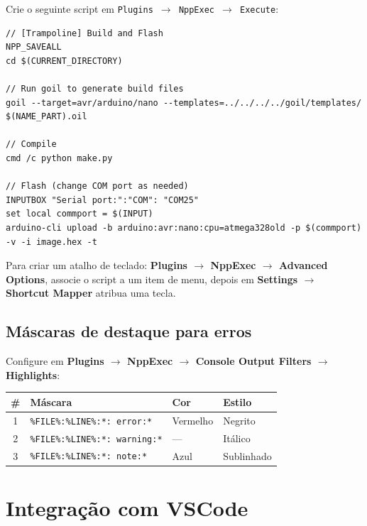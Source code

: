 \documentclass[12pt,a4paper]{article}
\begin{document}
Crie o seguinte script em \texttt{Plugins $\rightarrow$ NppExec $\rightarrow$ Execute}:

\begin{lstlisting}[caption={Script NppExec: trampoline\_build\_and\_flash.scp}]
// [Trampoline] Build and Flash
NPP_SAVEALL
cd $(CURRENT_DIRECTORY)

// Run goil to generate build files
goil --target=avr/arduino/nano --templates=../../../../goil/templates/ $(NAME_PART).oil

// Compile
cmd /c python make.py

// Flash (change COM port as needed)
INPUTBOX "Serial port:":"COM": "COM25"
set local commport = $(INPUT)
arduino-cli upload -b arduino:avr:nano:cpu=atmega328old -p $(commport) -v -i image.hex -t
\end{lstlisting}

\begin{dicabox}
Para criar um atalho de teclado: \textbf{Plugins $\rightarrow$ NppExec $\rightarrow$ Advanced Options}, associe o script a um item de menu, depois em \textbf{Settings $\rightarrow$ Shortcut Mapper} atribua uma tecla.
\end{dicabox}

\subsection{Máscaras de destaque para erros}

Configure em \textbf{Plugins $\rightarrow$ NppExec $\rightarrow$ Console Output Filters $\rightarrow$ Highlights}:

\begin{center}
\small
\begin{tabular}{clll}
  \toprule
  \textbf{\#} & \textbf{Máscara} & \textbf{Cor} & \textbf{Estilo} \\
  \midrule
  1 & \texttt{\%FILE\%:\%LINE\%:*: error:*} & Vermelho & Negrito \\
  2 & \texttt{\%FILE\%:\%LINE\%:*: warning:*} & --- & Itálico \\
  3 & \texttt{\%FILE\%:\%LINE\%:*: note:*} & Azul & Sublinhado \\
  \bottomrule
\end{tabular}
\end{center}

\section{Integração com VSCode}
\end{document}
